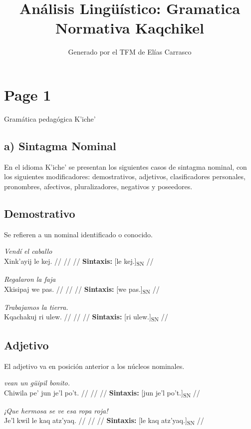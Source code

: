 \documentclass{article}%
\title{Análisis Lingüístico: Gramatica Normativa Kaqchikel}%
\author{Generado por el TFM de Elías Carrasco}%
\begin{document}
%
\normalsize%
\maketitle%
\section{Page 1}%
\label{sec:Page1}%
Gramática pedagógica K'iche' %
\subsection{a) Sintagma Nominal}%
\label{subsec:a)SintagmaNominal}%

%
En el idioma K'iche' se presentan los siguientes casos de sintagma nominal, con los %
siguientes modificadores: demostrativos, adjetivos, clasificadores personales, pronombres, %
afectivos, pluralizadores, negativos y poseedores. %
\subsection{Demostrativo}%
\label{subsec:Demostrativo}%

%
Se refieren a un nominal identificado o conocido. %
\par\medskip%
\ex
\textit{Vendí el caballo} \\
\begingl
\gla Xink'ayij le kej. //
\glb  //
\glc  //
\glft \textbf{Sintaxis:} [le kej.]\textsubscript{SN} //
\endgl
\xe
%
\medskip%
\par\medskip%
\ex
\textit{Regalaron la faja} \\
\begingl
\gla Xkisipaj we pas. //
\glb  //
\glc  //
\glft \textbf{Sintaxis:} [we pas.]\textsubscript{SN} //
\endgl
\xe
%
\medskip%
\par\medskip%
\ex
\textit{Trabajamos la tierra.} \\
\begingl
\gla Kqachakuj ri ulew. //
\glb  //
\glc  //
\glft \textbf{Sintaxis:} [ri ulew.]\textsubscript{SN} //
\endgl
\xe
%
\medskip%
\subsection{Adjetivo}%
\label{subsec:Adjetivo}%

%
El adjetivo va en posición anterior a los núcleos nominales. %
\par\medskip%
\ex
\textit{vean un güipil bonito.} \\
\begingl
\gla Chiwila pe' jun je'l po't. //
\glb  //
\glc  //
\glft \textbf{Sintaxis:} [jun je'l po't.]\textsubscript{SN} //
\endgl
\xe
%
\medskip%
\par\medskip%
\ex
\textit{¡Que hermosa se ve esa ropa roja!} \\
\begingl
\gla Je'l kwil le kaq atz'yaq. //
\glb  //
\glc  //
\glft \textbf{Sintaxis:} [le kaq atz'yaq.]\textsubscript{SN} //
\endgl
\xe
%
\medskip%
\end{document}
